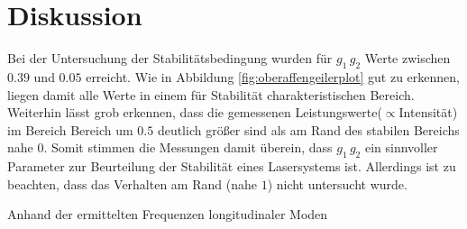 \section{Diskussion}
\label{sec:Diskussion}

Bei der Untersuchung der Stabilitätsbedingung wurden für $g_{1} \, g_{2}$
Werte zwischen $0.39$ und $0.05$ erreicht.
Wie in Abbildung \ref{fig:oberaffengeilerplot} gut zu erkennen, liegen damit alle Werte
in einem für Stabilität charakteristischen Bereich.
Weiterhin lässt grob erkennen, dass die gemessenen Leistungswerte($\propto$Intensität)
im Bereich Bereich um $0.5$ deutlich größer sind als am Rand des stabilen Bereichs nahe $0$.
Somit stimmen die Messungen damit überein, dass $g_{1} \, g_{2}$ ein sinnvoller Parameter zur
Beurteilung der Stabilität eines Lasersystems ist. Allerdings ist zu beachten, dass das Verhalten am
Rand (nahe $1$) nicht untersucht wurde.


Anhand der ermittelten Frequenzen longitudinaler Moden





